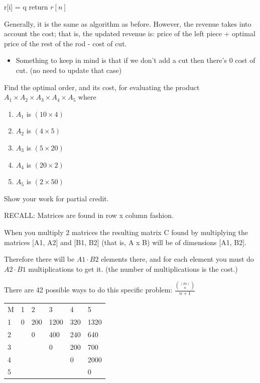 \documentclass[addpoints,11pt]{exam}
\begin{document}
\begin{questions}
\begin{solutionorbox}
\begin{codebox}
        
	\End
        \li r[i] = q
	\End
        \li return $r[n]$
    \end{codebox}



    Generally, it is the same as algorithm as before. However, the revenue takes into account the cost; that is, the updated revenue is: price of the left piece + optimal price of the rest of the rod - cost of cut. 
    \begin{itemize}
        \item Something to keep in mind is that if we don't add a cut then there's 0 cost of cut. (no need to update that case)
    \end{itemize} 
\end{solutionorbox}

\ifprintanswers
\newpage
\else
\bigskip
\fi


\question [10]
Find the optimal order, and its cost, for evaluating the product $A_1 \times A_2 \times A_3 \times A_4 \times A_5$ where
\begin{enumerate}
	\item $A_1$ is $(10 \times 4)$
	\item $A_2$ is $(4 \times 5)$
	\item $A_3$ is $(5 \times 20)$
	\item $A_4$ is $(20 \times 2)$
	\item $A_5$ is $(2 \times 50)$
\end{enumerate}
Show your work for partial credit.

\begin{solutionorbox}
RECALL: Matrices are found in row x column fashion.

When you multiply 2 matrices the resulting matrix C found by multiplying the matrices [A1, A2] and [B1, B2] (that is, A x B)  will be of dimensions [A1, B2]. 

Therefore there will be $A1 \cdot B2$ elements there, and for each element you must do $A2 \cdot B1$ multiplications to get it. (the number of multiplications is the cost.)

There are 42 possible ways to do this specific problem: $\frac{{(2n) \choose n}}{n+1} $

\begin{table}[H]
\begin{tabular}{llllll}
M & 1 & 2   & 3    & 4   & 5    \\
1 & 0 & 200 & 1200 & 320 & 1320 \\
2 &   & 0   & 400  & 240 & 640  \\
3 &   &     & 0    & 200 & 700  \\
4 &   &     &      & 0   & 2000 \\
5 &   &     &      &     & 0   
\end{tabular}
\end{table}


\end{solutionorbox}
\end{questions}
\end{document}
